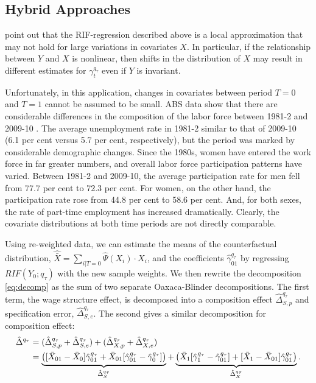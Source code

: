 \subsection{Hybrid Approaches}\label{sec:reweight}

\citet[p.19]{Firpo2011} point out that the RIF-regression described above is a local approximation that may not hold for large variations in covariates $X$. In particular, if the relationship between $Y$ and $X$ is nonlinear, then shifts in the distribution of $X$ may result in different estimates for $\gamma^{q_\tau}_t$ even if $Y$ is invariant. 

Unfortunately, in this application, changes in covariates between period $T=0$ and $T=1$ cannot be assumed to be small. ABS data show that there are considerable differences in the composition of the labor force between 1981-2 and 2009-10 \citep{LFSApr2013}. The average unemployment rate in 1981-2 similar to that of 2009-10 (6.1 per cent versus 5.7 per cent, respectively), but the period was marked by considerable demographic changes. Since the 1980s, women have entered the work force in far greater numbers, and overall labor force participation patterns have varied. Between 1981-2 and 2009-10, the average participation rate for men fell from 77.7 per cent to 72.3 per cent. For women, on the other hand, the participation rate rose from 44.8 per cent to 58.6 per cent. And, for both sexes, the rate of part-time employment has increased dramatically. Clearly, the covariate distributions at both time periods are not directly comparable.

Using re-weighted data, we can estimate the means of the counterfactual distribution, $\hat{\bar{X}}=\sum_{i|T=0}\hat{\Psi}(X_i) \cdot X_i$, and the coefficients $\hat{\gamma}_{01}^{q_\tau}$ by regressing $RIF(Y_0;q_\tau)$ with the new sample weights. We then rewrite the decomposition \eqref{eq:decomp} as the sum of two separate Oaxaca-Blinder decompositions. The first term, the wage structure effect, is decomposed into a composition effect $\hat{\Delta}^{q_\tau}_{S,p}$ and specification error, $\hat{\Delta}^{q_\tau}_{S,e}$. The second gives a similar decomposition for composition effect:
\begin{align}
  \hat{\Delta}^{q_\tau} &= (\hat{\Delta}^{q_\tau}_{S,p} + \hat{\Delta}^{q_\tau}_{S,e}) + (\hat{\Delta}^{q_\tau}_{X,p} + \hat{\Delta}^{q_\tau}_{X,e}) \notag \\
  &= \underbrace{\left( [\bar{X}_{01} - \bar{X}_0 ] \hat{\gamma}^{q_\tau}_{01} +
    \bar{X}_{01}[\hat{\gamma}_{01}^{q_\tau} - \hat{\gamma}_0^{q_\tau}] \right)}_{\hat{\Delta}^{q_\tau}_{S}} +
  \underbrace{\left( \bar{X}_{1}[\hat{\gamma}_{1}^{q_\tau} - \hat{\gamma}_{01}^{q_\tau}] + 
    [\bar{X}_{1} - \bar{X}_{01} ] \hat{\gamma}^{q_\tau}_{01}\right)}_{\hat{\Delta}^{q_\tau}_{X}}.
\end{align}

